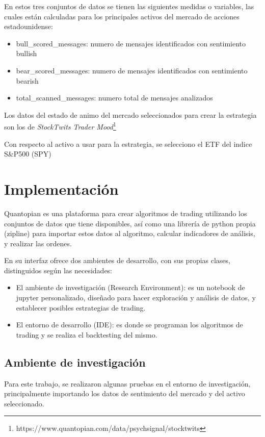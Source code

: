 \documentclass[a4paper, 11pt, twocolumn]{article}
\begin{document}
En estos tres conjuntos de datos se tienen las siguientes medidas o variables, las cuales están calculadas para los principales activos del mercado de acciones estadounidense:

\begin{itemize}
    \item bull\_scored\_messages: numero de mensajes identificados con sentimiento bullish
    \item bear\_scored\_messages: numero de mensajes identificados con sentimiento bearish
    \item total\_scanned\_messages: numero total de mensajes analizados
\end{itemize}

Los datos del estado de animo del mercado seleccionados para crear la estrategia son los de \textit{StockTwits Trader Mood}\footnote{https://www.quantopian.com/data/psychsignal/stocktwits}

Con respecto al activo a usar para la estrategia, se selecciono el ETF del indice S\&P500 (SPY)

\section{Implementación}
Quantopian es una plataforma para crear algoritmos de trading utilizando los conjuntos de datos que tiene disponibles, así como una librería de python propia (zipline) para importar estos datos al algoritmo, calcular indicadores de análisis, y realizar las ordenes.

En su interfaz ofrece dos ambientes de desarrollo, con sus propias clases, distinguidos según las necesidades:
\begin{itemize}
    \item El ambiente de investigación (Research Environment): es un notebook de jupyter personalizado, diseñado para hacer exploración y análisis de datos, y establecer posibles estrategias de trading.
    \item El entorno de desarrollo (IDE): es donde se programan los algoritmos de trading y se realiza el backtesting del mismo.
\end{itemize}

\subsection{Ambiente de investigación}

Para este trabajo, se realizaron algunas pruebas en el entorno de investigación, principalmente importando los datos de sentimiento del mercado y del activo seleccionado.
\end{document}
